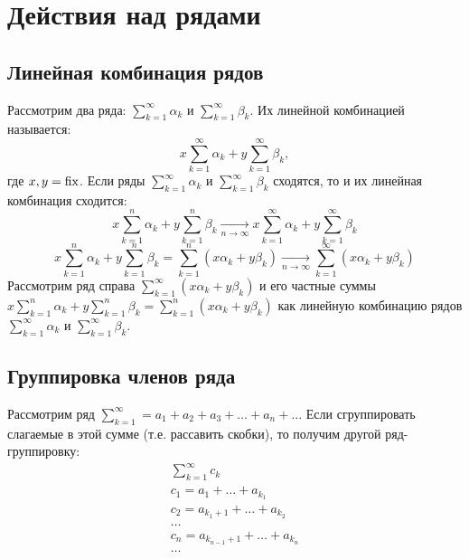 \documentclass[../../main.tex]{subfiles}
\begin{document}
\section{Действия над рядами}
\subsection{Линейная комбинация рядов}
Рассмотрим два ряда:
$\sum\limits_{k = 1}^{\infty} \alpha_k$ и
$\sum\limits_{k = 1}^{\infty} \beta_k$.
Их линейной комбинацией называется:
\[x \sum\limits_{k = 1}^{\infty} \alpha_k + y \sum\limits_{k = 1}^{\infty} \beta_k,\]
где $x,y = \operatorname{fix}$.
Если ряды
$\sum\limits_{k = 1}^{\infty} \alpha_k$ и
$\sum\limits_{k = 1}^{\infty} \beta_k$
сходятся, то и их линейная комбинация сходится:
\[x \sum\limits_{k = 1}^{n} \alpha_k + y \sum\limits_{k = 1}^{n} \beta_k
\underset{n \to \infty} {\longrightarrow}
x \sum\limits_{k = 1}^{\infty} \alpha_k + y \sum\limits_{k = 1}^{\infty} \beta_k\]
\[x \sum\limits_{k = 1}^{n} \alpha_k + y \sum\limits_{k = 1}^{n} \beta_k
= \sum\limits_{k = 1}^{n} (x \alpha_k + y \beta_k)
\underset{n \to \infty} {\longrightarrow}
\sum\limits_{k = 1}^{\infty} (x \alpha_k + y \beta_k)\]
Рассмотрим ряд справа $\sum\limits_{k = 1}^{\infty} (x \alpha_k + y \beta_k)$
и его частные суммы
$x \sum\limits_{k = 1}^{n} \alpha_k + y \sum\limits_{k = 1}^{n} \beta_k
= \sum\limits_{k = 1}^{n} (x \alpha_k + y \beta_k)$
как линейную комбинацию рядов $\sum\limits_{k = 1}^{\infty} \alpha_k$ и
$\sum\limits_{k = 1}^{\infty} \beta_k$.

\subsection{Группировка членов ряда}
Рассмотрим ряд $\sum\limits_{k = 1}^{\infty} = a_1 + a_2 + a_3 + \ldots + a_n + ...$
Если сгруппировать слагаемые в этой сумме (т.е. рассавить скобки), то получим
другой ряд-группировку:
\begin{equation}
\begin{gathered}
	\label{lec30, series_groups}
	\sum\limits_{k = 1}^{\infty} c_k \\
	c_1 = a_1 + \ldots + a_{k_1} \\
	c_2 = a_{k_1+1} + \ldots + a_{k_2} \\
	\ldots \\
	c_n = a_{k_{n-1}+1} + \ldots + a_{k_n} \\
	\ldots
\end{gathered}
\end{equation}
\end{document}
